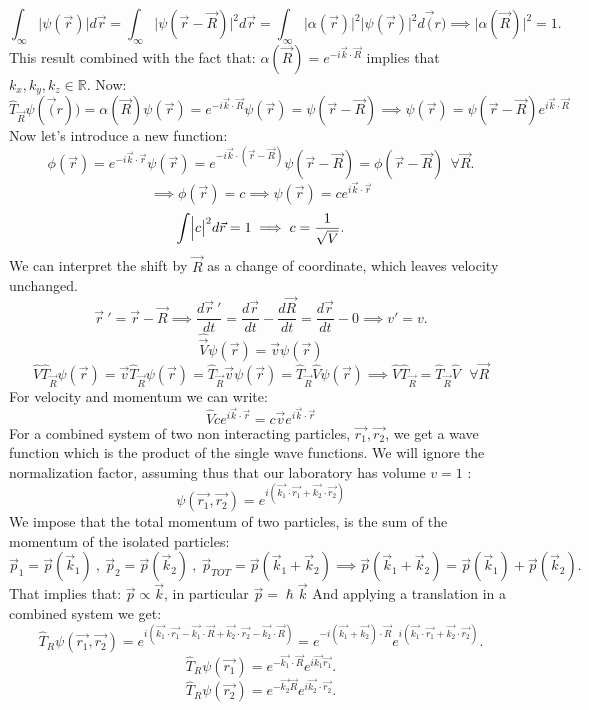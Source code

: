 \documentclass{article}
\begin{document}
$$ \int_{\infty} \bigl| \psi(\vec{r}) \bigl| d\vec{r} = \int_{\infty} \bigl| \psi(\vec{r}-\vec{R}) \bigl|^2 d\vec{r} = \int_{\infty} \bigl| \alpha(\vec{r}) \bigl| ^2 \bigl| \psi(\vec{r}) \bigl|^2 d\vec(r) \implies \bigl| \alpha(\vec{R}) \bigl|^2 = 1. $$
This result combined with the fact that: $ \alpha(\vec{R}) = e^{-i \vec{k} \cdot \vec{R}} $ implies that $k_x,k_y,k_z \in \mathbb{R}.$
Now:
$$ \hat{T}_{\vec{R}} \psi(\vec(r)) = \alpha(\vec{R}) \psi(\vec{r}) = e^{-i \vec{k} \cdot \vec{R}} \psi(\vec{r}) = \psi(\vec{r}-\vec{R}) \implies \psi(\vec{r}) = \psi(\vec{r}-\vec{R}) e^{i \vec{k} \cdot \vec{R}} $$
Now let's introduce a new function:
$$\phi(\vec{r}) = e^{-i \vec{k} \cdot \vec{r}} \psi(\vec{r}) = e^{-i \vec{k}\cdot(\vec{r}-\vec{R})} \psi(\vec{r}-\vec{R}) = \phi(\vec{r}-\vec{R}) \ \ \forall \vec{R}.$$
$$\implies \phi(\vec{r}) = c \implies \psi(\vec{r}) = c e^{i\vec{k} \cdot \vec{r}}$$
$$\int \Bigl|c\bigl|^2 d\vec{r} =1 \implies c = \frac{1}{\sqrt{V}}.$$
We can interpret the shift by $\vec{R}$ as a change of coordinate, which leaves velocity unchanged.
$$ \vec{r} \ ' = \vec{r} -\vec{R} \implies \frac{d\vec{r} \ ' }{dt} = \frac{d\vec{r}}{dt} - \frac{d\vec{R}}{dt}  = \frac{d\vec{r}}{dt} - 0 \implies v' = v.$$
$$\hat{\vec{V}}\psi(\vec{r}) = \vec{v}\psi(\vec{r})$$
$$\hat{V}\hat{T}_{\vec{R}}\psi(\vec{r}) = \vec{v}\hat{T}_{\vec{R}}\psi(\vec{r}) = \hat{T}_{\vec{R}}\vec{v} \psi(\vec{r}) = \hat{T}_{\vec{R}}\hat{V}\psi(\vec{r}) \implies \hat{V}\hat{T}_{\vec{R}} =   \hat{T}_{\vec{R}}\hat{V}  \ \ \ \forall \vec{R} $$
For velocity and momentum we can write:
$$ \hat{V} ce^{i\vec{k} \cdot \vec{r}}=c\vec{v}e^{i\vec{k} \cdot \vec{r}}$$
For a combined system of two non interacting particles, $\vec{r_1},\vec{r_2}$, we get a wave function which is the product of the single wave functions. We will ignore the normalization factor, assuming thus that our laboratory has volume $v=1$ :
$$\psi(\vec{r_1},\vec{r_2}) = e^{i(\vec{k_1}\cdot\vec{r_1}+\vec{k_2}\cdot \vec{r_2})}$$
We impose that the total momentum of two particles, is the sum of the momentum of the isolated particles:
$$\vec{p}_1 = \vec{p}(\vec{k}_1) \ , \ \vec{p}_2 = \vec{p}(\vec{k}_2) \ , \ \vec{p}_{TOT} = \vec{p}(\vec{k}_1+\vec{k}_2) \implies \vec{p}(\vec{k}_1+\vec{k}_2) = \vec{p}(\vec{k}_1) + \vec{p}(\vec{k}_2). $$ 
That implies that: $\vec{p} \varpropto \vec{k}$, in particular $\vec{p} = \hslash \vec{k}$ 
And applying a translation in a combined system we get:
$$\hat{T}_{R}\psi(\vec{r_1},\vec{r_2}) = e^{i(\vec{k_1}\cdot\vec{r_1}-\vec{k_1}\cdot\vec{R}+\vec{k_2}\cdot\vec{r_2}-\vec{k_2}\cdot\vec{R})} = e^{-i(\vec{k_1}+\vec{k_2})\cdot\vec{R}} e^{i(\vec{k_1}\cdot\vec{r_1}+\vec{k_2}\cdot\vec{r_2})}.$$
$$\hat{T}_{R} \psi(\vec{r_1}) = e^{-\vec{k_1}\cdot \vec{R}}e^{i\vec{k_1}\vec{r_1}}.$$
$$\hat{T}_{R} \psi(\vec{r_2}) = e^{-\vec{k_2}\vec{R}}e^{i\vec{k_2} \cdot\vec{r_2}}.$$
\end{document}
